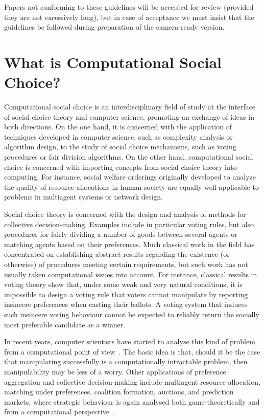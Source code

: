\documentclass{comsoc2025}
\begin{document}
Papers not conforming to these guidelines will be accepted for review (provided they are not excessively long), but in case of acceptance we must insist that the guidelines be followed during preparation of the camera-ready version. 


\section{What is Computational Social Choice?}

Computational social choice \cite{bra-con-end-lan-pro:b:handbook-comsoc,rot:b-2nd-edition:economics-and-computation,pro:j:comsoc-first-four-centuries,che-end-lan-mau:c:computational-social-choice} is an interdisciplinary field of study at the interface of social choice theory and computer science, promoting an exchange of ideas in both directions. On the one hand, it is concerned with the application of techniques developed in computer science, such as complexity analysis or algorithm design, to the study of social choice mechanisms, such as voting procedures or fair division algorithms. On the other hand, computational social choice is concerned with importing concepts from social choice theory into computing. For instance, social welfare orderings originally developed to analyze the quality of resource allocations in human society are equally well applicable to problems in multiagent systems or network design.

Social choice theory is concerned with the design and analysis of methods for collective decision-making. Examples include in particular voting rules, but also procedures for fairly dividing a number of goods between several agents or matching agents based on their preferences.
Much classical work in the field has concentrated on establishing abstract results regarding the existence (or otherwise) of procedures meeting certain requirements, but such work has not usually taken computational issues into account. For instance, classical results in voting theory show that, under some weak and very natural conditions, it is impossible to design a voting rule that voters cannot manipulate by reporting insincere preferences when casting their ballots. A voting system that induces such insincere voting behaviour cannot be expected to reliably return the socially most preferable candidate as a winner.

In recent years, computer scientists have started to analyse this kind of problem from a computational point of view~\cite{fal-hem-hem-rot:b:richer,fal-hem-hem:j:cacm-survey,fal-pro:j:manipulation}. The basic idea is that, should it be the case that manipulating successfully is a computationally intractable problem, then manipulability may be less of a worry. Other applications of preference aggregation and collective decision-making include multiagent resource allocation, matching under preferences, coalition formation, auctions, and prediction markets, where strategic behaviour is again analysed both game-theoretically and from a computational perspective~\cite{mei:b:strategic-voting}. 
\end{document}
